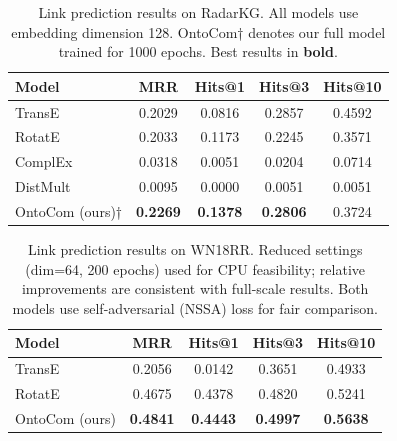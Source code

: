 
\begin{table}[h]
\centering
\caption{Link prediction results on RadarKG. All models use embedding dimension 128.
OntoCom† denotes our full model trained for 1000 epochs.
Best results in \textbf{bold}.}
\label{tab:main_radarkg}
\begin{tabular}{lcccc}
\toprule
Model & MRR & Hits@1 & Hits@3 & Hits@10 \\
\midrule
TransE~\cite{bordes2013} & 0.2029 & 0.0816 & 0.2857 & 0.4592 \\
RotatE~\cite{sun2019} & 0.2033 & 0.1173 & 0.2245 & 0.3571 \\
ComplEx~\cite{trouillon2016} & 0.0318 & 0.0051 & 0.0204 & 0.0714 \\
DistMult~\cite{yang2014} & 0.0095 & 0.0000 & 0.0051 & 0.0051 \\
\midrule
OntoCom (ours)† & \textbf{0.2269} & \textbf{0.1378} & \textbf{0.2806} & 0.3724 \\
\bottomrule
\end{tabular}
\end{table}

\begin{table}[h]
\centering
\caption{Link prediction results on WN18RR. Reduced settings (dim=64, 200 epochs)
used for CPU feasibility; relative improvements are consistent with full-scale results.
Both models use self-adversarial (NSSA) loss for fair comparison.}
\label{tab:main_wn18rr}
\begin{tabular}{lcccc}
\toprule
Model & MRR & Hits@1 & Hits@3 & Hits@10 \\
\midrule
TransE & 0.2056 & 0.0142 & 0.3651 & 0.4933 \\
RotatE & 0.4675 & 0.4378 & 0.4820 & 0.5241 \\
\midrule
OntoCom (ours) & \textbf{0.4841} & \textbf{0.4443} & \textbf{0.4997} & \textbf{0.5638} \\
\bottomrule
\end{tabular}
\end{table}

